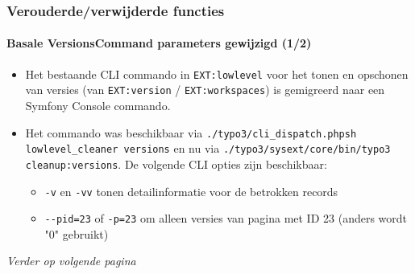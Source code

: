 \begin{frame}[fragile]
	\frametitle{Verouderde/verwijderde functies}
	\framesubtitle{Basale VersionsCommand parameters gewijzigd (1/2)}

	\begin{itemize}
		\item Het bestaande CLI commando in \texttt{EXT:lowlevel} voor het tonen en opschonen van versies (van
			\texttt{EXT:version} / \texttt{EXT:workspaces}) is gemigreerd naar een Symfony Console commando.

		\item Het commando was beschikbaar via \texttt{./typo3/cli\_dispatch.phpsh lowlevel\_cleaner versions}
			en nu via \texttt{./typo3/sysext/core/bin/typo3 cleanup:versions}. De volgende CLI opties zijn
			beschikbaar:

			\begin{itemize}
				\item \texttt{-v} en \texttt{-vv} tonen detailinformatie voor de betrokken records
				\item \texttt{-}\texttt{-pid=23} of \texttt{-p=23} om alleen versies van pagina met ID 23 (anders wordt "0" gebruikt)
			\end{itemize}

	\end{itemize}

	\small\textit{Verder op volgende pagina}\normalsize

\end{frame}


